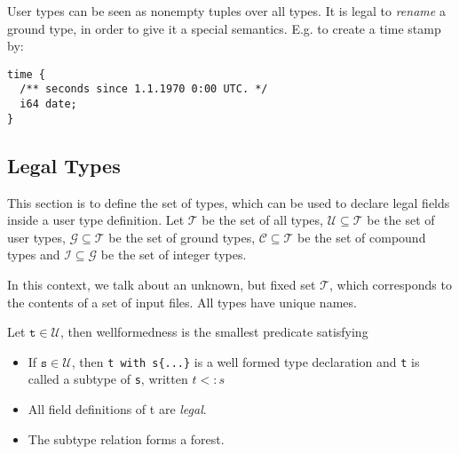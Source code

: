 \documentclass[a4paper,10pt]{article}
\begin{document}
User types can be seen as nonempty tuples over all types. It is legal to \textit{rename} a ground type, in order to give it a special semantics. E.g. to create a time stamp by:
\begin{lstlisting}[label=timeExample,caption=Time,language=skill]
time {
  /** seconds since 1.1.1970 0:00 UTC. */
  i64 date;
}
\end{lstlisting}

\subsection*{Legal Types}

This section is to define the set of types, which can be used to declare legal fields inside a user type definition. Let $\mathcal{T}$ be the set of all types, $\mathcal{U} \subseteq \mathcal{T}$ be the set of user types, $\mathcal{G} \subseteq \mathcal{T}$ be the set of ground types, $\mathcal{C} \subseteq \mathcal{T}$ be the set of compound types and $\mathcal{I} \subseteq \mathcal{G}$ be the set of integer types.

In this context, we talk about an unknown, but fixed set $\mathcal{T}$, which corresponds to the contents of a set of input files. All types have unique names.

Let $\texttt{t} \in \mathcal{U}$, then wellformedness is the smallest predicate satisfying
\begin{itemize}
 \item If $\texttt{s} \in \mathcal{U}$, then \verb/t with s{...}/ is a well formed type declaration and \texttt{t} is called a subtype of \texttt{s}, written $t <: s$
 
 \item All field definitions of t are \textit{legal}.
 
 \item The subtype relation forms a forest.
\end{itemize}
\end{document}
